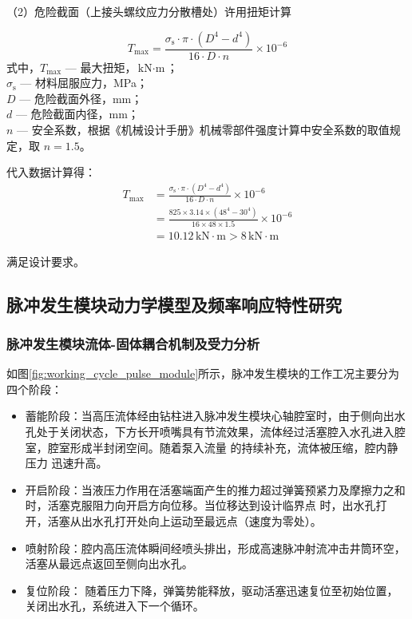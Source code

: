 （2）危险截面（上接头螺纹应力分散槽处）许用扭矩计算


\begin{equation}
    T_{\max} = \frac{\sigma_{\mathrm{s}} \cdot \pi \cdot (D^4 - d^4)}{16 \cdot D \cdot n} \times 10^{-6}
\end{equation}
式中，$T_{\max}$ — 最大扭矩，$\text{kN}\cdot\text{m}$；\\
$\sigma_{\mathrm{s}}$ — 材料屈服应力，MPa；\\
$D$ — 危险截面外径，mm；\\
$d$ — 危险截面内径，mm；\\
$n$ — 安全系数，根据《机械设计手册》机械零部件强度计算中安全系数的取值规定\cite{ref26}，取 $n = 1.5$。

代入数据计算得：
\begin{align}
    T_{\max} &= \frac{\sigma_{\mathrm{s}} \cdot \pi \cdot (D^4 - d^4)}{16 \cdot D \cdot n} \times 10^{-6} \\
             &= \frac{825 \times 3.14 \times (48^4 - 30^4)}{16 \times 48 \times 1.5} \times 10^{-6} \\
             &= 10.12 \, \text{kN}\cdot\text{m} > 8 \, \text{kN}\cdot\text{m}
\end{align}

满足设计要求。

\subsection{脉冲发生模块动力学模型及频率响应特性研究}
\subsubsection{脉冲发生模块流体-固体耦合机制及受力分析}

如图\ref{fig:working_cycle_pulse_module}所示，脉冲发生模块的工作工况主要分为四个阶段：

\begin{itemize}
	\item 蓄能阶段：当高压流体经由钻柱进入脉冲发生模块心轴腔室时，由于侧向出水孔处于关闭状态，下方长开喷嘴具有节流效果，流体经过活塞腔入水孔进入腔室，腔室形成半封闭空间。随着泵入流量 的持续补充，流体被压缩，腔内静压力  迅速升高。
	\item 开启阶段：当液压力作用在活塞端面产生的推力超过弹簧预紧力及摩擦力之和时，活塞克服阻力向开启方向位移。当位移达到设计临界点 时，出水孔打开，活塞从出水孔打开处向上运动至最远点（速度为零处）。
	\item 喷射阶段：腔内高压流体瞬间经喷头排出，形成高速脉冲射流冲击井筒环空，活塞从最远点返回至侧向出水孔。 
	\item 复位阶段： 随着压力下降，弹簧势能释放，驱动活塞迅速复位至初始位置，关闭出水孔，系统进入下一个循环。
\end{itemize}


